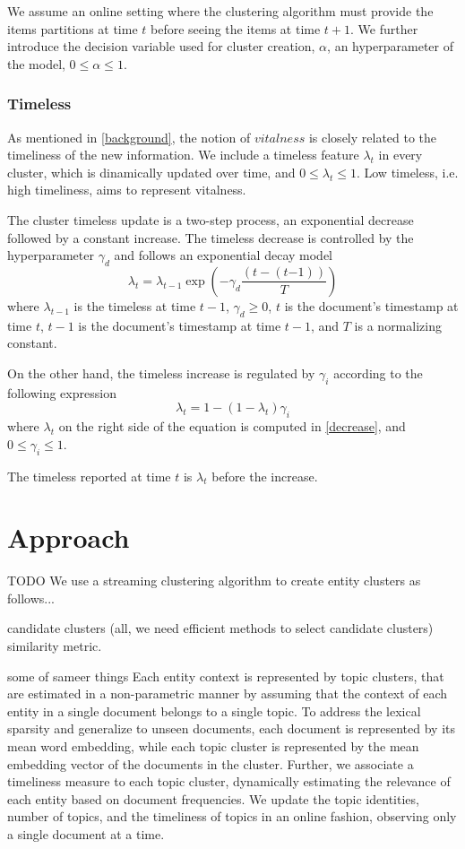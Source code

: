 \documentclass{article}
\begin{document}
We assume an online setting where the clustering algorithm must provide the items partitions at time $t$ before seeing the items at time $t+1$. We further introduce the decision variable used for cluster creation, $\alpha$, an hyperparameter of the model, $0 \leq \alpha \leq 1$.

\subsubsection{Timeless}

As mentioned in \ref{background}, the notion of $vitalness$ is closely related to the timeliness of the new information. We include a timeless feature $\lambda_t$ in every cluster, which is dinamically updated over time, and $0 \leq \lambda_t \leq 1$. Low timeless, i.e. high timeliness, aims to represent vitalness.

The cluster timeless update is a two-step process, an exponential decrease followed by a constant increase.
The timeless decrease is controlled by the hyperparameter $\gamma_d$ and follows an exponential decay model
\begin{equation}
\label{decrease}
\lambda_t = \lambda_{t-1} \exp{(-\gamma_d \frac{(t-(t\mathord{-}1))}{T})}
\end{equation}
where $\lambda_{t-1}$ is the timeless at time $t-1$, $\gamma_d \geq 0$, $t$ is the document's timestamp at time $t$, $t-1$ is the document's timestamp at time $t-1$, and $T$ is a normalizing constant.

On the other hand, the timeless increase is regulated by $\gamma_i$ according to the following expression
\begin{equation}
\lambda_t = 1 - (1 - \lambda_t) \gamma_i
\end{equation}
where $\lambda_t$ on the right side of the equation is computed in \ref{decrease}, and $0 \leq \gamma_i \leq 1$.

The timeless reported at time $t$ is $\lambda_t$ before the increase.

\section{Approach}
\label{approach}

TODO 
We use a streaming clustering algorithm to create entity clusters as follows...

candidate clusters (all, we need efficient methods to select candidate clusters)
similarity metric.

some of sameer things
Each entity context is represented by topic clusters, that are estimated in a non-parametric manner by assuming that the context of each entity in a single document belongs to a single topic. To address the lexical sparsity and generalize to unseen documents, each document is represented by its mean word embedding, while each topic cluster is represented by the mean embedding vector of the documents in the cluster. Further, we associate a timeliness measure to each topic cluster, dynamically estimating the relevance of each entity based on document frequencies. We update the topic identities, number of topics, and the timeliness of topics in an online fashion, observing only a single document at a time. 
\end{document}
